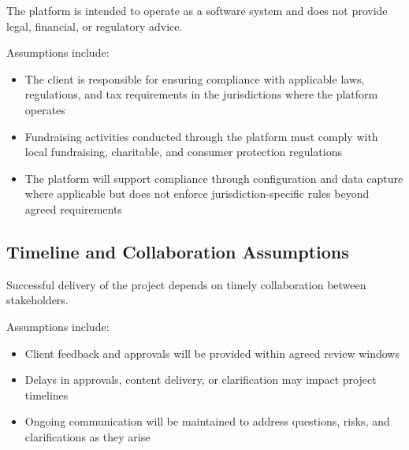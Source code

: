 The platform is intended to operate as a software system and does not provide
legal, financial, or regulatory advice.

Assumptions include:
\begin{itemize}[leftmargin=1.5em]
    \item The client is responsible for ensuring compliance with applicable laws,
    regulations, and tax requirements in the jurisdictions where the platform
    operates
    \item Fundraising activities conducted through the platform must comply with
    local fundraising, charitable, and consumer protection regulations
    \item The platform will support compliance through configuration and data
    capture where applicable but does not enforce jurisdiction-specific rules
    beyond agreed requirements
\end{itemize}

\subsection{Timeline and Collaboration Assumptions}

Successful delivery of the project depends on timely collaboration between
stakeholders.

Assumptions include:
\begin{itemize}[leftmargin=1.5em]
    \item Client feedback and approvals will be provided within agreed review
    windows
    \item Delays in approvals, content delivery, or clarification may impact
    project timelines
    \item Ongoing communication will be maintained to address questions, risks,
    and clarifications as they arise
\end{itemize}
